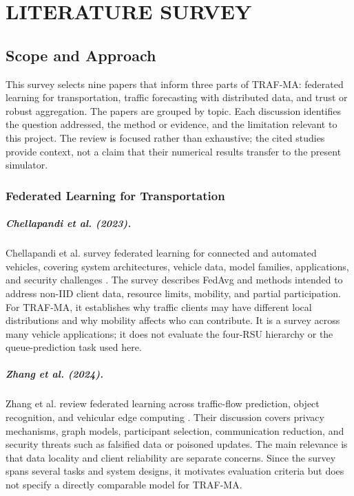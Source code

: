 \chapter{LITERATURE SURVEY}\label{ch:survey}

\section{Scope and Approach}
This survey selects nine papers that inform three parts of TRAF-MA: federated learning for transportation, traffic forecasting with distributed data, and trust or robust aggregation. The papers are grouped by topic. Each discussion identifies the question addressed, the method or evidence, and the limitation relevant to this project. The review is focused rather than exhaustive; the cited studies provide context, not a claim that their numerical results transfer to the present simulator.

\subsection{Federated Learning for Transportation}
\paragraph{Chellapandi et al. (2023).}
Chellapandi et al. survey federated learning for connected and automated vehicles, covering system architectures, vehicle data, model families, applications, and security challenges \cite{chellapandi2023}. The survey describes FedAvg and methods intended to address non-IID client data, resource limits, mobility, and partial participation. For TRAF-MA, it establishes why traffic clients may have different local distributions and why mobility affects who can contribute. It is a survey across many vehicle applications; it does not evaluate the four-RSU hierarchy or the queue-prediction task used here.

\paragraph{Zhang et al. (2024).}
Zhang et al. review federated learning across traffic-flow prediction, object recognition, and vehicular edge computing \cite{zhang2024}. Their discussion covers privacy mechanisms, graph models, participant selection, communication reduction, and security threats such as falsified data or poisoned updates. The main relevance is that data locality and client reliability are separate concerns. Since the survey spans several tasks and system designs, it motivates evaluation criteria but does not specify a directly comparable model for TRAF-MA.


